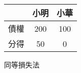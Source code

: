 \begin{center}
	\hfill
	\begin{tabular}{r|cc}
		\toprule
		& 小明 & 小華 \\
		\hline
		債權 & 200 & 100 \\
		分得 & 50  & 0   \\
		\bottomrule
	\end{tabular}
	\hfill\textsf{\small{同等損失法}}
\end{center}
